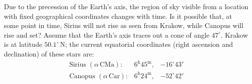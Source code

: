 Due to the precession of the Earth's axis, the region of sky visible from a
location with fixed geographical coordinates changes with time. Is it possible
that, at some point in time, Sirius will not rise as seen from Krakow, while
Canopus will rise and set? Assume that the Earth's axis traces out a cone of
angle $47^\circ$. Krakow is at latitude $50.1^\circ$\,N; the current
equatorial coordinates (right ascension and declination) of these stars are:
\[
\begin{array}{lll}
\text{Sirius } (\alpha\,\text{CMa}): &
  6^{\mathrm{h}}45^{\mathrm{m}}, & -16^\circ 43' \\
\text{Canopus } (\alpha\,\text{Car}): &
  6^{\mathrm{h}}24^{\mathrm{m}}, & -52^\circ 42'
\end{array}
\]
